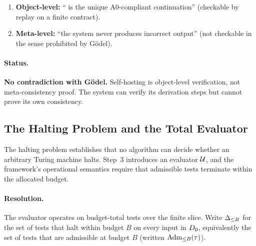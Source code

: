 \begin{enumerate}[nosep]
  \item \textbf{Object-level:} `` is the unique A0-compliant
        continuation'' (checkable by replay on a finite contract).
  \item \textbf{Meta-level:} ``the system never produces incorrect output''
        (not checkable in the sense prohibited by G\"{o}del).
\end{enumerate}

\paragraph{Status.}
\textbf{No contradiction with G\"{o}del.}  Self-hosting is object-level
verification, not meta-consistency proof.  The system can verify its
derivation steps but cannot prove its own consistency.

\subsection{The Halting Problem and the Total Evaluator}
\label{app:oq:halting}

The halting problem establishes that no algorithm can decide whether an
arbitrary Turing machine halts.  Step~3 introduces an evaluator $\mathcal{U}$,
and the framework's operational semantics require that admissible tests
terminate within the allocated budget.

\paragraph{Resolution.}
The evaluator operates on budget-total tests over the finite slice.
Write $\Delta_{\leq B}$ for the set of tests that halt within budget $B$ on
every input in $D_0$, equivalently the set of tests that are
admissible at budget $B$ (written $\mathrm{Adm}_{\leq B}(\tau)$).

